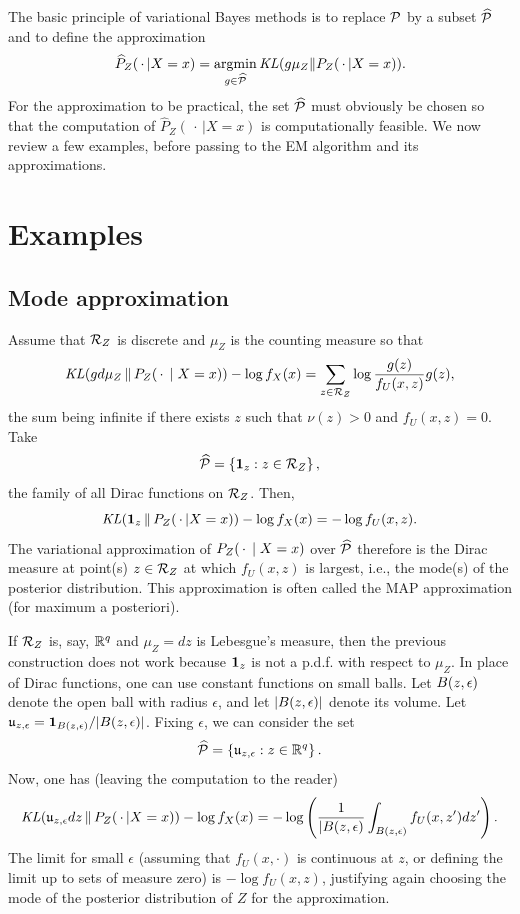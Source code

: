 The basic principle of variational Bayes methods is to replace  ${\mathcal P}$ by a subset ${\widehat{\mathcal{P}}}$ and to define the approximation
\[
\widehat P_Z(\,\cdot\,|X=x) = \operatorname*{argmin}_{g \in {\widehat{\mathcal{P}}}} \mathit{KL}(g \mu_Z\|P_Z(\,\cdot\,|X=x)).
\]
For the approximation to be practical, the set ${\widehat{\mathcal{P}}}$ must obviously be chosen so that the computation of $\widehat P_Z(\,\cdot\,|X=x)$ is computationally feasible. We now review a few examples, before passing to the EM algorithm and its  approximations.

\section{Examples}
\label{sec:var.bayes.expl}
\subsection{Mode approximation}
\label{sec:mode.approx}
Assume that ${\mathcal R}_Z$ is discrete and $\mu_Z$ is the counting measure so that 
\[
\mathit{KL}(gd\mu_Z\,\|\,P_Z(\,\cdot\,\mid X=x))  - \log f_X(x) = \sum_{z\in {\mathcal R}_Z} \log \frac{g(z)}{f_U(x,z)} g(z),
\]
the sum being infinite if there exists $z$ such that $\nu(z) > 0$ and $f_U(x, z) = 0$.
Take 
\[
{\widehat{\mathcal{P}}} = \left\{ {\bm 1}_z: z\in {\mathcal R}_Z \right\},
\]
the family of all Dirac functions on ${\mathcal R}_Z$. Then,
\[
\mathit{KL}({\bm 1}_z\,\|\,P_Z(\,\cdot\,|X=x)) - \log f_X(x) =  -\log f_U(x,z).
\]
The variational approximation of $P_Z(\,\cdot\,\mid X=x)$ over ${\widehat{\mathcal{P}}}$ therefore is the Dirac measure at point(s) $z\in {\mathcal R}_Z$ at which $f_U(x, z)$ is largest, i.e., the mode(s) of the posterior distribution. This approximation is often called the MAP approximation (for maximum a posteriori).


If ${\mathcal R}_Z$ is, say, ${\mathbb{R}}^q$ and $\mu_Z=dz$ is Lebesgue's measure, then the previous construction does not work because ${\bm 1}_z$ is not a p.d.f. with respect to $\mu_Z$. In place  of Dirac functions, one can use constant functions  on small balls. Let $B(z, \epsilon)$ denote the open ball with radius $\epsilon$, and let $|B(z, \epsilon)|$ denote its volume. Let $\mathfrak u_{z,\epsilon} = {\bm 1}_{B(z,\epsilon)}/|B(z, \epsilon)|$. Fixing $\epsilon$, we can consider the set 
\[
{\widehat{\mathcal{P}}} = \left\{ \mathfrak u_{z, \epsilon}: z\in {\mathbb{R}}^q \right\}.
\]
Now, one has (leaving the computation to the reader)
\[
\mathit{KL}(\mathfrak u_{z, \epsilon} dz\,\|\,P_Z(\,\cdot\,|X=x)) - \log f_X(x) =  -\log \left(\frac{1}{|B(z, \epsilon)}\int_{B(z, \epsilon)} f_U(x, z') dz' \right).
\]
The limit for small $\epsilon$  (assuming that $f_U(x, \cdot)$ is continuous at $z$, or defining the limit up to sets of measure zero) is $ -\log f_U(x,z)$, justifying again choosing the mode of the posterior distribution of $Z$ for the approximation. 

